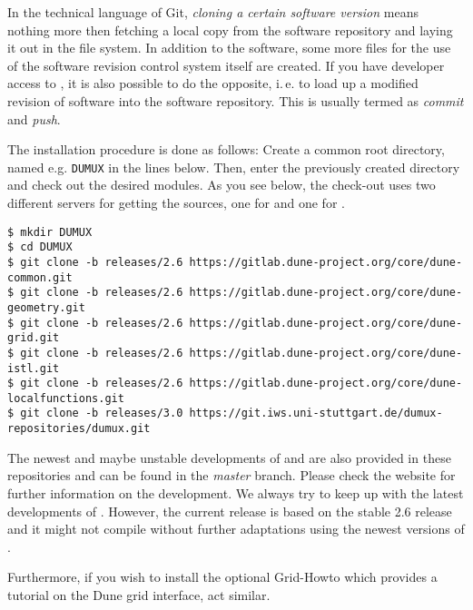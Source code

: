 In the technical language of Git, \emph{cloning a certain software version} means nothing more then fetching
a local copy from the software repository and laying it out in the file system.
In addition to the software, some more files for the use of the software revision
control system itself are created. If you have developer access to \Dumux, it is
also possible to do the opposite, i.\,e. to load up a modified revision of software
into the software repository. This is usually termed as \emph{commit} and \emph{push}.

The installation procedure is done as follows:
Create a common root directory, named e.g. \texttt{DUMUX} in the lines below.
Then, enter the previously created directory and check out the desired modules.
As you see below, the check-out uses two different servers for getting the sources,
one for \Dune and one for \Dumux.

\begin{lstlisting}[style=Bash]
$ mkdir DUMUX
$ cd DUMUX
$ git clone -b releases/2.6 https://gitlab.dune-project.org/core/dune-common.git
$ git clone -b releases/2.6 https://gitlab.dune-project.org/core/dune-geometry.git
$ git clone -b releases/2.6 https://gitlab.dune-project.org/core/dune-grid.git
$ git clone -b releases/2.6 https://gitlab.dune-project.org/core/dune-istl.git
$ git clone -b releases/2.6 https://gitlab.dune-project.org/core/dune-localfunctions.git
$ git clone -b releases/3.0 https://git.iws.uni-stuttgart.de/dumux-repositories/dumux.git
\end{lstlisting}

The newest and maybe unstable developments of \Dune and \Dumux are also provided in these repositories and can be found in the \emph{master} branch.
Please check the \Dune website \cite{DUNE-HP} for further information on the \Dune development. We always try to keep up with the latest developments of \Dune.
However, the current \Dumux release is based on the stable 2.6 release and it might not compile without further adaptations using the newest versions of \Dune.

Furthermore, if you wish to install the optional \Dune Grid-Howto which provides a tutorial
on the Dune grid interface, act similar.


